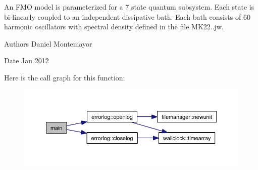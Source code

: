 An F\+MO model is parameterized for a 7 state quantum subsystem. Each state is bi-\/linearly coupled to an independent dissipative bath. Each bath consists of 60 harmonic oscillators with spectral density defined in the file \textquotesingle{}M\+K22..\+jw\textquotesingle{}. \begin{DoxyAuthor}{Authors}
Daniel Montemayor
\end{DoxyAuthor}
\begin{DoxyDate}{Date}
Jan 2012 
\end{DoxyDate}
Here is the call graph for this function\+:\nopagebreak
\begin{figure}[H]
\begin{center}
\leavevmode
\includegraphics[width=350pt]{share_2examples_2fmo_m_p_i_2system__driver_8f90_a8ec2266d83cd6c0b762cbcbc92c0af3d_cgraph}
\end{center}
\end{figure}
